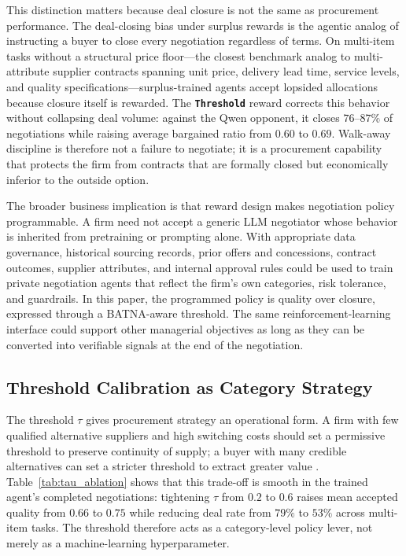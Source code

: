 \documentclass{interact}
\theoremstyle{plain}
\theoremstyle{definition}
\theoremstyle{remark}
\newcommand{\Threshold}{\textbf{\texttt{Threshold}}\xspace}
\begin{document}
This distinction matters because deal closure is not the same as procurement performance. The deal-closing bias under surplus rewards is the agentic analog of instructing a buyer to close every negotiation regardless of terms. On multi-item tasks without a structural price floor---the closest benchmark analog to multi-attribute supplier contracts spanning unit price, delivery lead time, service levels, and quality specifications---surplus-trained agents accept lopsided allocations because closure itself is rewarded. The \Threshold reward corrects this behavior without collapsing deal volume: against the Qwen opponent, it closes $76$--$87\%$ of negotiations while raising average bargained ratio from $0.60$ to $0.69$. Walk-away discipline is therefore not a failure to negotiate; it is a procurement capability that protects the firm from contracts that are formally closed but economically inferior to the outside option.

The broader business implication is that reward design makes negotiation policy programmable. A firm need not accept a generic LLM negotiator whose behavior is inherited from pretraining or prompting alone. With appropriate data governance, historical sourcing records, prior offers and concessions, contract outcomes, supplier attributes, and internal approval rules could be used to train private negotiation agents that reflect the firm's own categories, risk tolerance, and guardrails. In this paper, the programmed policy is quality over closure, expressed through a BATNA-aware threshold. The same reinforcement-learning interface could support other managerial objectives as long as they can be converted into verifiable signals at the end of the negotiation.

\subsection{Threshold Calibration as Category Strategy}

The threshold $\tau$ gives procurement strategy an operational form. A firm with few qualified alternative suppliers and high switching costs should set a permissive threshold to preserve continuity of supply; a buyer with many credible alternatives can set a stricter threshold to extract greater value \cite{kaufmann2004mode,nyaga2013power}. Table~\ref{tab:tau_ablation} shows that this trade-off is smooth in the trained agent's completed negotiations: tightening $\tau$ from $0.2$ to $0.6$ raises mean accepted quality from $0.66$ to $0.75$ while reducing deal rate from $79\%$ to $53\%$ across multi-item tasks. The threshold therefore acts as a category-level policy lever, not merely as a machine-learning hyperparameter.
\end{document}
